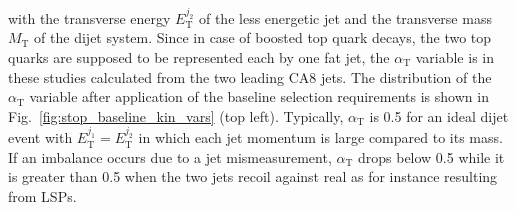 \begin{description}
with the transverse energy $E_\mathrm{T}^{j_2}$ of the less energetic jet and the transverse mass $M_\mathrm{T}$ of the dijet system. Since in case of boosted top quark decays, the two top quarks are supposed to be represented each by one fat jet, the $\alpha_\mathrm{T}$ variable is in these studies calculated from the two leading CA8 jets. The distribution of the $\alpha_\mathrm{T}$ variable after application of the baseline selection requirements is shown in Fig.~\ref{fig:stop_baseline_kin_vars} (top left). Typically, $\alpha_\mathrm{T}$ is 0.5 for an ideal dijet event with $E_\mathrm{T}^{j_1} = E_\mathrm{T}^{j_2}$ in which each jet momentum is large compared to its mass. If an imbalance occurs due to a jet mismeasurement, $\alpha_\mathrm{T}$ drops below 0.5 while it is greater than 0.5 when the two jets recoil against real \met as for instance resulting from LSPs.
\end{description} 
